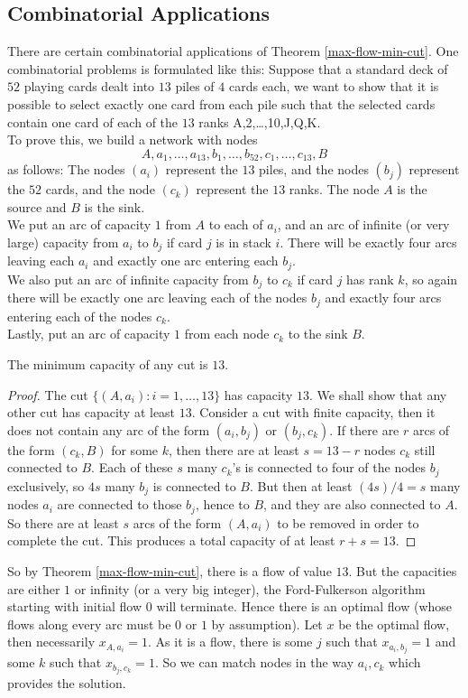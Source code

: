 \subsection{Combinatorial Applications}
There are certain combinatorial applications of Theorem \ref{max-flow-min-cut}.
One combinatorial problems is formulated like this:
Suppose that a standard deck of $52$ playing cards dealt into $13$ piles of $4$ cards each, we want to show that it is possible to select exactly one card from each pile such that the selected cards contain one card of each of the $13$ ranks A,2,\dots,10,J,Q,K.\\
To prove this, we build a network with nodes
$$A,a_1,\ldots,a_{13},b_1,\ldots,b_{52},c_1,\ldots,c_{13},B$$
as follows:
The nodes $(a_i)$ represent the $13$ piles, and the nodes $(b_j)$ represent the $52$ cards, and the node $(c_k)$ represent the $13$ ranks.
The node $A$ is the source and $B$ is the sink.\\
We put an arc of capacity $1$ from $A$ to each of $a_i$, and an arc of infinite (or very large) capacity from $a_i$ to $b_j$ if card $j$ is in stack $i$.
There will be exactly four arcs leaving each $a_i$ and exactly one arc entering each $b_j$.\\
We also put an arc of infinite capacity from $b_j$ to $c_k$ if card $j$ has rank $k$, so again there will be exactly one arc leaving each of the nodes $b_j$ and exactly four arcs entering each of the nodes $c_k$.\\
Lastly, put an arc of capacity $1$ from each node $c_k$ to the sink $B$.
\begin{claim}
    The minimum capacity of any cut is $13$.
\end{claim}
\begin{proof}
    The cut $\{(A,a_i):i=1,\ldots,13\}$ has capacity $13$.
    We shall show that any other cut has capacity at least $13$.
    Consider a cut with finite capacity, then it does not contain any arc of the form $(a_i,b_j)$ or $(b_j,c_k)$.
    If there are $r$ arcs of the form $(c_k,B)$ for some $k$, then there are at least $s=13-r$ nodes $c_k$ still connected to $B$.
    Each of these $s$ many $c_k$'s is connected to four of the nodes $b_j$ exclusively, so $4s$ many $b_j$ is connected to $B$.
    But then at least $(4s)/4=s$ many nodes $a_i$ are connected to those $b_j$, hence to $B$, and they are also connected to $A$.
    So there are at least $s$ arcs of the form $(A,a_i)$ to be removed in order to complete the cut.
    This produces a total capacity of at least $r+s=13$.
\end{proof}
So by Theorem \ref{max-flow-min-cut}, there is a flow of value $13$.
But the capacities are either $1$ or infinity (or a very big integer), the Ford-Fulkerson algorithm starting with initial flow $0$ will terminate.
Hence there is an optimal flow (whose flows along every arc must be $0$ or $1$ by assumption).
Let $x$ be the optimal flow, then necessarily $x_{A,a_i}=1$.
As it is a flow, there is some $j$ such that $x_{a_i,b_j}=1$ and some $k$ such that $x_{b_j,c_k}=1$.
So we can match nodes in the way $a_i,c_k$ which provides the solution.
